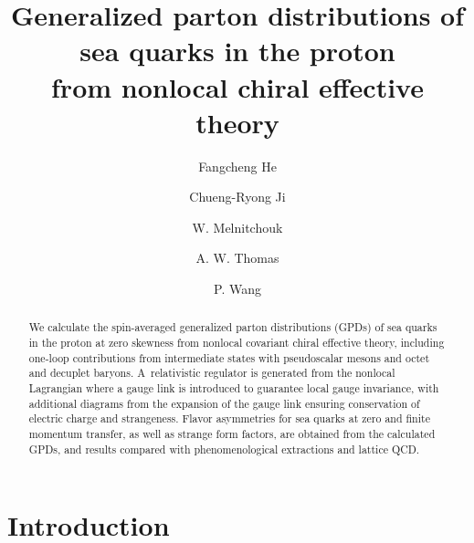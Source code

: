 \documentclass[preprintnumbers,prd,superscriptaddress,preprint]{revtex4-1}
\begin{document}

\title{Generalized parton distributions of sea quarks in the proton \\ from nonlocal chiral effective theory}

\author{Fangcheng He}
\author{Chueng-Ryong Ji}
\author{W. Melnitchouk}
\author{A. W. Thomas}
\author{P. Wang}

\begin{abstract}
We calculate the spin-averaged generalized parton distributions (GPDs) of sea quarks in the proton at zero skewness %
from nonlocal covariant chiral effective theory, including one-loop contributions from intermediate states with pseudoscalar mesons and octet and decuplet baryons.
A~relativistic regulator is generated from the nonlocal Lagrangian where a gauge link is introduced to guarantee local gauge invariance, with additional diagrams from the expansion of the gauge link ensuring conservation of electric charge and strangeness.
Flavor asymmetries for sea quarks at zero and finite momentum transfer, as well as strange form factors, are obtained from the calculated GPDs, and results compared with phenomenological extractions and lattice QCD.
\end{abstract}


\maketitle

\section{Introduction}
\end{document}
